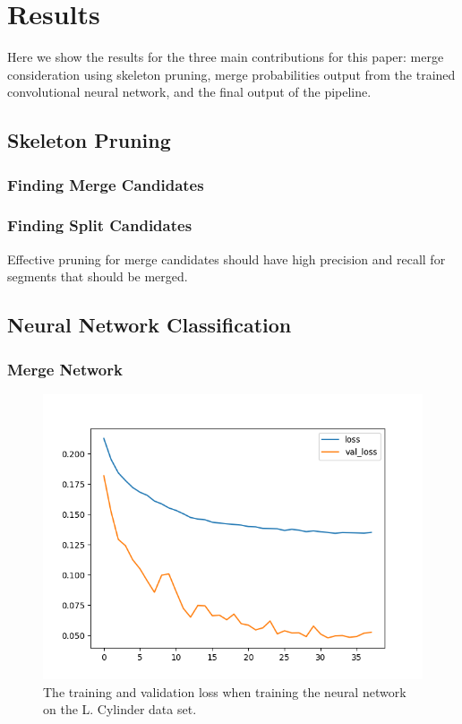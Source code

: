 \section{Results}

Here we show the results for the three main contributions for this paper: merge consideration using skeleton pruning, merge probabilities output from the trained convolutional neural network, and the final output of the pipeline. 

\subsection{Skeleton Pruning}

\subsubsection{Finding Merge Candidates}


\subsubsection{Finding Split Candidates}

Effective pruning for merge candidates should have high precision and recall for segments that should be merged.

\subsection{Neural Network Classification}

\subsubsection{Merge Network}



\begin{figure}
	\includegraphics[width=0.85\linewidth]{figures/skeleton-training-curve.png}
	\caption{The training and validation loss when training the neural network on the L. Cylinder data set.}
	\label{fig:training-curve}
\end{figure}

